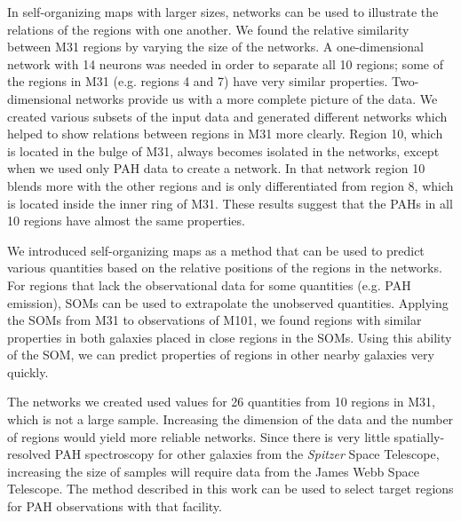 \documentclass[useAMS,usenatbib]{mn2e}
\newcommand \Spitzer {{\it Spitzer }}
\begin{document}
In self-organizing maps with larger sizes, networks can be used to illustrate the relations of the regions with one another.
We found the relative similarity between M31 regions by varying the size of the networks.
A one-dimensional network with 14 neurons was needed in order to
separate all 10 regions; some of the regions in M31 (e.g. regions 4 and 7) have very similar properties.
Two-dimensional networks provide us with a more complete picture of the data.
We created various subsets of the input data and generated different networks which helped to show relations between regions in M31 more clearly.
Region 10, which is located in the bulge of M31, always becomes isolated in the networks, except when we  used only PAH data to create a network.
In that network region 10 blends more with the other regions and is only differentiated from region 8, which is located inside the inner ring of M31.
These results suggest that the PAHs in all 10 regions have almost the same properties.

We introduced self-organizing maps as a method that can be used to predict various quantities based on the relative positions of the regions in the networks.
For regions that lack the observational data for some quantities (e.g. PAH emission), SOMs can be used to extrapolate the unobserved quantities.
Applying the SOMs from M31 to observations of M101, we found regions with similar properties in both galaxies placed in close regions in the SOMs.
Using this ability of the SOM, we can predict properties of regions in other nearby galaxies very quickly.

The networks we created used values for 26 quantities from 10 regions in M31, which is not a large sample.
Increasing the dimension of the data and the number of regions would yield more reliable networks.
Since there is very little spatially-resolved PAH spectroscopy for other galaxies from the \Spitzer Space Telescope, increasing the size of samples will require data from the James Webb Space Telescope.
The method described in this work can be used to select target regions for PAH observations with that facility. 

 
\end{document}
